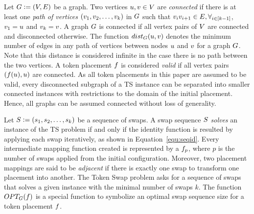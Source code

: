 \documentclass[msc,english,table,xcdraw]{ppgccufmg}
\begin{document}
Let $G \vcentcolon= (V,E)$ be a graph.
Two vertices $u, v \in V$ are 
\textit{connected} if there is at least one \textit{path of vertices} 
$(v_1, v_2, \ldots, v_k)$ in $G$ such that 
$v_{i}v_{i+1} \in E, \forall_{i\in[k-1]}$, 
$v_{1} = u$ and $v_{k} = v$.
A graph $G$ is connected if all vertex pairs of $V$ are 
connected and disconnected otherwise.
The function $dist_{G}(u, v)$ denotes the minimum number of edges in 
any path of vertices between nodes $u$ and $v$ for a graph 
$G$.
Note that this distance is considered infinite in the case there is no 
path between the two vertices.
A token placement $f$ is considered \textit{valid} if all vertex pairs
$(f(u), u)$ are connected.
As all token placements in this paper are assumed to be valid, every 
disconnected subgraph of a TS instance can be separated into smaller connected 
instances with restrictions to the domain of the initial placement.
Hence, all graphs can be assumed connected without loss of generality.


Let $S \vcentcolon= (s_1, s_2, \ldots, s_k)$ be a 
sequence of swaps.
A swap sequence $S$ \textit{solves} an instance of the TS problem if and 
only if the identity function is resulted by applying each swap iteratively, as 
shown in Equation~\ref{equ:seqid}. 
Every intermediate mapping function created is represented by a $f_p$, 
where $p$ is the number of swaps applied from the initial configuration.
Moreover, two placement mappings are said to be \textit{adjacent} if there is 
exactly one swap to transform one placement into another.
The Token Swap problem asks for a sequence of swaps that solves a given 
instance with the minimal number of swaps $k$.
The function $OPT_{G}(f)$ is a special function to symbolize an optimal swap
sequence size for a token placement $f$.
\end{document}
